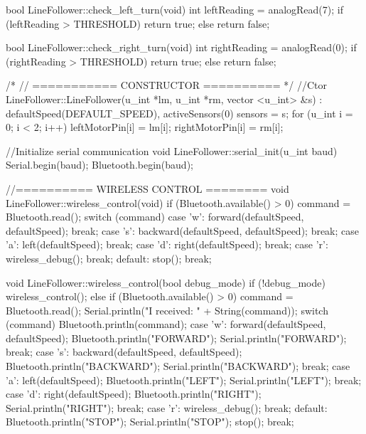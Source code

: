 \documentclass[14pt,a4paper]{extarticle}
\begin{document}
\begin{spverbatim}
bool LineFollower::check_left_turn(void)
{
  int leftReading = analogRead(7);
  if (leftReading > THRESHOLD) return true;
  else return false;
}

bool LineFollower::check_right_turn(void)
{
  int rightReading = analogRead(0);
  if (rightReading > THRESHOLD) return true;
  else return false;
}

/*
//  =========== CONSTRUCTOR ==========
*/
//Ctor
LineFollower::LineFollower(u_int *lm, u_int *rm, vector <u_int> &s)
: defaultSpeed(DEFAULT_SPEED),
  activeSensors(0) {
  sensors = s;
  for (u_int i = 0; i < 2; i++)
  {
    leftMotorPin[i] = lm[i];
    rightMotorPin[i] = rm[i];
  }
}

//Initialize serial communication
void LineFollower::serial_init(u_int baud)
{
  Serial.begin(baud);
  Bluetooth.begin(baud);
}

//========== WIRELESS CONTROL ========
void LineFollower::wireless_control(void)
{
  if (Bluetooth.available() > 0) 
  	command = Bluetooth.read();
  switch (command)
  {
    case 'w':
      forward(defaultSpeed, defaultSpeed);
      break;
    case 's':
      backward(defaultSpeed, defaultSpeed);
      break;
    case 'a':
      left(defaultSpeed);
      break;
    case 'd':
      right(defaultSpeed);
      break;
    case 'r':
      wireless_debug();
      break;
    default:
      stop();
      break;
  }
}

void LineFollower::wireless_control(bool debug_mode)
{
  if (!debug_mode) wireless_control();
  else
  {
    if (Bluetooth.available() > 0){
      command = Bluetooth.read();
      Serial.println("I received: " + String(command));
    }
    switch (command){
      Bluetooth.println(command);
      case 'w':
        forward(defaultSpeed, defaultSpeed);
        Bluetooth.println("FORWARD");
        Serial.println("FORWARD");
        break;
      case 's':
        backward(defaultSpeed, defaultSpeed);
        Bluetooth.println("BACKWARD");
        Serial.println("BACKWARD");
        break;
      case 'a':
        left(defaultSpeed);
        Bluetooth.println("LEFT");
        Serial.println("LEFT");
        break;
      case 'd':
        right(defaultSpeed);
        Bluetooth.println("RIGHT");
        Serial.println("RIGHT");
        break;
      case 'r':
        wireless_debug();
        break;
      default:
        Bluetooth.println("STOP");
        Serial.println("STOP");
        stop();
        break;
    }
  }
}

	\end{spverbatim}
	
\end{document}
